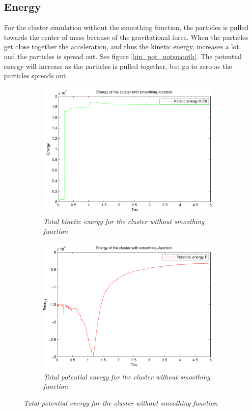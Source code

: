 \documentclass[a4paper,12pt, english]{article}
\begin{document}
\subsection*{Energy}

For the cluster simulation without the smoothing function, the particles is pulled towards the center of mass because of the gravitational force. When the particles get close together the acceleration, and thus the kinetic energy, increases a lot and the particles is spread out. See figure \ref{kin_pot_notsmooth}. The potential energy will increase as the particles is pulled together, but go to zero as the particles spreads out. 

\begin{figure}[H]
	\centering
        \begin{subfigure}[b]{0.6\textwidth}
        \includegraphics[scale=0.5]{kin_energy_without_smooth.pdf}
        \caption{\textit{Total kinetic energy for the cluster without smoothing function}}
        
		\end{subfigure}
		
		\begin{subfigure}[b]{0.6\textwidth}
        \includegraphics[scale=0.5]{pot_e_uten_smooth.pdf}
        \caption{\textit{Total potential energy for the cluster without smoothing function}}
		\end{subfigure}
		

\end{figure}
\end{document}
